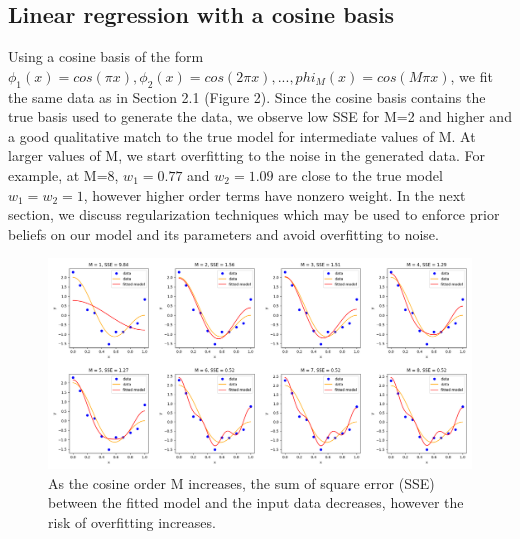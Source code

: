 \documentclass[12pt]{article}
\begin{document}

\subsection{Linear regression with a cosine basis}

Using a cosine basis of the form $\phi_1(x) = cos(\pi x), \phi_2(x) = cos(2\pi x), ... , phi_M(x) = cos(M\pi x)$, we fit the same data as in Section 2.1 (Figure 2). Since the cosine basis contains the true basis used to generate the data, we observe low SSE for M=2 and higher and a good qualitative match to the true model for intermediate values of M. At larger values of M, we start overfitting to the noise in the generated data. For example, at M=8, $w_1=0.77$ and $w_2=1.09$ are close to the true model $w_1 = w_2 = 1$, however higher order terms have nonzero weight. In the next section, we discuss regularization techniques which may be used to enforce prior beliefs on our model and its parameters and avoid overfitting to noise.

\begin{figure}
\caption{As the cosine order M increases, the sum of square error (SSE) between the fitted model and the input data decreases, however the risk of overfitting increases.}
\begin{center}
\includegraphics[width=450px]{all_regress_cos}
\end{center}
\end{figure}
\end{document}
